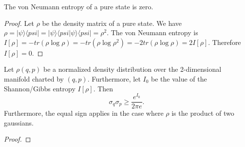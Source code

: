 \documentclass[10pt,twocolumn, nofootinbib]{revtex4-2}
\begin{document}
\begin{prop}
	The von Neumann entropy of a pure state is zero.
\end{prop}

\begin{proof}
	Let $\rho$ be the density matrix of a pure state. We have $\rho = |\psi \rangle \langle psi | = |\psi \rangle \langle psi |\psi \rangle \langle psi | = \rho^2$. The von Neumann entropy is $I[\rho] = - tr (\rho \log \rho) = - tr (\rho \log \rho^2) = - 2 tr (\rho \log \rho) = 2 I[\rho]$. Therefore $I[\rho] = 0$.
\end{proof}

\begin{prop}
	Let $\rho(q,p)$ be a normalized density distribution over the 2-dimensional manifold charted by $(q,p)$. Furthermore, let $I_0$ be the value of the Shannon/Gibbs entropy $I[\rho]$. Then
	$$ 	\sigma_q \sigma_p \geq \frac{e^{I_0}}{2 \pi e}.$$
	Furthermore, the equal sign applies in the case where $\rho$ is the product of two gaussians.
\end{prop}

\begin{proof}
	
	
\end{proof}



\end{document}
